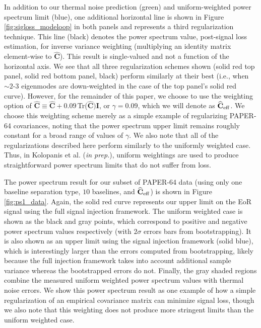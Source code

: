 \documentclass[preprint2,numberedappendix,tighten]{aastex6}  %
\begin{document}
In addition to our thermal noise prediction (green) and uniform-weighted power spectrum limit (blue), one additional horizontal line is shown in Figure \ref{fig:sigloss_modeloop} 
in both panels and represents a third regularization technique. This line (black) denotes the power spectrum value, post-signal loss estimation, for inverse variance weighting (multiplying an identity 
matrix element-wise to $\widehat{\textbf{C}}$). This result is single-valued and not a function of the horizontal axis. We see that all three regularization schemes shown (solid red top panel, solid red bottom panel, black) perform similarly at 
their best (i.e., when $\sim2$-$3$ eigenmodes are down-weighted in the case of the top panel's solid red curve). However, for the remainder of this paper, we choose to use the weighting option of $\widehat{\textbf{C}} \equiv \widehat{\textbf{C}} + 0.09 \,$Tr($\widehat{\textbf{C}})\textbf{I}$, or $\gamma = 0.09$, which we will denote as $\widehat{\textbf{C}}_{\rm eff}$. We choose this weighting scheme merely as a simple example of regularizing PAPER-64 covariances, noting that the power spectrum upper limit remains roughly constant for a broad range of values of $\gamma$. We also note that all of the regularizations described here perform similarly to the uniformly weighted case. Thus, in Kolopanis et al. (\textit{in prep.}), uniform weightings are used to produce straightforward power spectrum limits that do not suffer from loss. 

The power spectrum result for our subset of PAPER-64 data (using only one baseline separation type, $10$ baselines, and $\widehat{\textbf{C}}_{\rm eff}$) is shown in Figure 
\ref{fig:ps1_data}. Again, the solid red curve represents our upper limit on the EoR signal using the full signal injection framework. The uniform weighted case is shown as the black and gray points, which correspond to positive and negative power spectrum values respectively (with 
$2\sigma$ errors bars from bootstrapping). It is also shown as an upper limit using the signal injection framework (solid blue), which is interestingly larger than the errors computed from bootstrapping, likely because the full injection framework takes into account additional sample variance whereas the bootstrapped errors do not. Finally, the gray shaded regions combine the measured uniform weighted power spectrum values with thermal noise errors. We show this power spectrum result as one example of how a simple regularization of an empirical covariance matrix can minimize signal loss, though we also note that this weighting does not produce more stringent limits than the uniform weighted case. 
\end{document}
